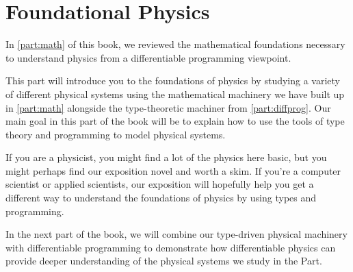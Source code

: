 \documentclass[book.tex]{subfiles}
\begin{document}
\part{Foundational Physics}
\label{part:physics}

In \autoref{part:math} of this book, we reviewed the mathematical foundations necessary to understand physics from a differentiable programming viewpoint. 

This part will introduce you to the foundations of physics by studying a variety of different physical systems using the mathematical machinery we have built up in \autoref{part:math} alongside the type-theoretic machiner from \autoref{part:diffprog}. Our main goal in this part of the book will be to explain how to use the tools of type theory and programming to model physical systems.

If you are a physicist, you might find a lot of the physics here basic, but you might perhaps find our exposition novel and worth a skim. If you're a computer scientist or applied scientists, our exposition will hopefully help you get a different way to understand the foundations of physics by using types and programming.

In the next part of the book, we will combine our type-driven physical machinery with differentiable programming to demonstrate how differentiable physics can provide deeper understanding of the physical systems we study in the Part.
\end{document}
